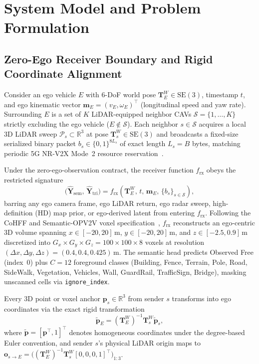 \documentclass[journal]{IEEEtran}
\begin{document}
\section{System Model and Problem Formulation}
\label{sec:formulation}

\subsection{Zero-Ego Receiver Boundary and Rigid Coordinate Alignment}

Consider an ego vehicle $E$ with 6-DoF world pose $\mathbf{T}_E^W \in \mathrm{SE}(3)$, timestamp $t$, and ego kinematic vector $\mathbf{m}_E = (v_E, \omega_E)^\top$ (longitudinal speed and yaw rate). Surrounding $E$ is a set of $K$ LiDAR-equipped neighbor CAVs $\mathcal{S} = \{1, \dots, K\}$ strictly excluding the ego vehicle ($E \notin \mathcal{S}$). Each neighbor $s \in \mathcal{S}$ acquires a local 3D LiDAR sweep $\mathcal{P}_s \subset \mathbb{R}^3$ at pose $\mathbf{T}_s^W \in \mathrm{SE}(3)$ and broadcasts a fixed-size serialized binary packet $b_s \in \{0,1\}^{8 L_s}$ of exact length $L_s = B$ bytes, matching periodic 5G NR-V2X Mode~2 resource reservation~\cite{molina2024reeval}.

Under the zero-ego-observation contract, the receiver function $f_{\mathrm{rx}}$ obeys the restricted signature
\begin{equation}
\big(\hat{\mathbf{Y}}_{\mathrm{sem}},\, \hat{\mathbf{Y}}_{\mathrm{tri}}\big) = f_{\mathrm{rx}}\!\left(\mathbf{T}_E^W,\, t,\, \mathbf{m}_E,\, \{b_s\}_{s \in \mathcal{S}}\right),
\label{eq:zero_ego_sig}
\end{equation}
barring any ego camera frame, ego LiDAR return, ego radar sweep, high-definition (HD) map prior, or ego-derived latent from entering $f_{\mathrm{rx}}$. Following the CoHFF and Semantic-OPV2V voxel specification~\cite{song2024cohff}, $f_{\mathrm{rx}}$ reconstructs an ego-centric 3D volume spanning $x \in [-20, 20]\,\mathrm{m}$, $y \in [-20, 20]\,\mathrm{m}$, and $z \in [-2.5, 0.9]\,\mathrm{m}$ discretized into $G_x \times G_y \times G_z = 100 \times 100 \times 8$ voxels at resolution $(\Delta x, \Delta y, \Delta z) = (0.4, 0.4, 0.425)\,\mathrm{m}$. The semantic head predicts Observed Free (index~0) plus $C = 12$ foreground classes (Building, Fence, Terrain, Pole, Road, SideWalk, Vegetation, Vehicles, Wall, GuardRail, TrafficSign, Bridge), masking unscanned cells via \texttt{ignore\_index}.

Every 3D point or voxel anchor $\mathbf{p}_s \in \mathbb{R}^3$ from sender $s$ transforms into ego coordinates via the exact rigid transformation~\cite{xu2022opv2v,song2024cohff}
\begin{equation}
\tilde{\mathbf{p}}_E = \left(\mathbf{T}_E^W\right)^{-1} \mathbf{T}_s^W \tilde{\mathbf{p}}_s,
\label{eq:se3_transform}
\end{equation}
where $\tilde{\mathbf{p}} = [\mathbf{p}^\top, 1]^\top$ denotes homogeneous coordinates under the degree-based Euler convention, and sender $s$'s physical LiDAR origin maps to $\mathbf{o}_{s \to E} = \big((\mathbf{T}_E^W)^{-1} \mathbf{T}_s^W [0,0,0,1]^\top\big)_{1:3}$.
\end{document}
